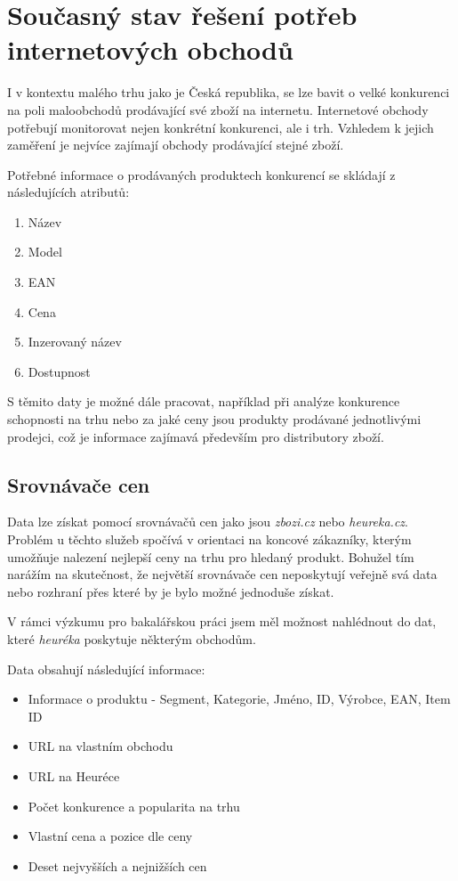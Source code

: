 \documentclass[thesis=B,czech]{FITthesis}[2012/06/26]
\begin{document}
\newpage

\section{Současný stav řešení potřeb internetových obchodů}
I v kontextu malého trhu jako je Česká republika, se lze bavit o velké konkurenci na poli 
maloobchodů prodávající své zboží na internetu.
Internetové obchody potřebují monitorovat nejen konkrétní konkurenci, ale i trh. Vzhledem k jejich zaměření je nejvíce zajímají 
obchody prodávající stejné zboží. 
\par
Potřebné informace o prodávaných produktech konkurencí se skládají z následujících atributů:

\begin{enumerate}
\item Název
\item Model
\item EAN
\item Cena
\item Inzerovaný název
\item Dostupnost
\end{enumerate}

S těmito daty je možné dále pracovat, například při analýze konkurence schopnosti na trhu nebo za jaké ceny jsou produkty prodávané
jednotlivými prodejci, což je informace zajímavá především pro distributory zboží. \cite{hunka}

\subsection{Srovnávače cen}

Data lze získat pomocí srovnávačů cen jako jsou \textit{zbozi.cz}\cite{heureka} 
nebo \textit{heureka.cz}\cite{zbozi}. Problém u těchto služeb spočívá v orientaci na koncové zákazníky, kterým umožňuje
nalezení nejlepší ceny na trhu pro hledaný produkt. Bohužel tím narážím na skutečnost, že největší srovnávače cen neposkytují veřejně 
svá data nebo rozhraní přes které by je bylo možné jednoduše získat. 
\par
V rámci výzkumu pro bakalářskou práci jsem měl možnost nahlédnout do dat, které \textit{heuréka} poskytuje některým obchodům. \cite{hunka}

Data obsahují následující informace:
\begin{itemize}
\item Informace o produktu - Segment, Kategorie, Jméno, ID, Výrobce, EAN, Item ID
\item URL na vlastním obchodu
\item URL na Heuréce
\item Počet konkurence a popularita na trhu
\item Vlastní cena a pozice dle ceny
\item Deset nejvyšších a nejnižších cen
\end{itemize}
\end{document}
